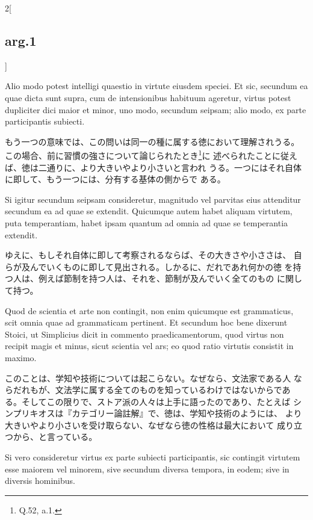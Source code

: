 \documentclass[paper=a4paper,fontsize=10pt,jafontsize=9pt,titlepage]{jlreq}
\begin{document}
\begin{paracol}{2}[\subsection{arg.1}]
\switchcolumn*

Alio modo potest intelligi quaestio in virtute eiusdem speciei. Et
 sic, secundum ea quae dicta sunt supra, cum de intensionibus habituum
 ageretur, virtus potest dupliciter dici maior et minor, uno modo,
 secundum seipsam; alio modo, ex parte participantis subiecti.

\switchcolumn

もう一つの意味では、この問いは同一の種に属する徳において理解されうる。
 この場合、前に習慣の強さについて論じられたとき\footnote{Q.52, a.1.}に
 述べられたことに従えば、徳は二通りに、より大きいやより小さいと言われ
 うる。一つにはそれ自体に即して、もう一つには、分有する基体の側からで
 ある。

\switchcolumn*

Si igitur secundum seipsam consideretur, magnitudo vel parvitas eius
 attenditur secundum ea ad quae se extendit. Quicumque autem habet
 aliquam virtutem, puta temperantiam, habet ipsam quantum ad omnia ad
 quae se temperantia extendit.

\switchcolumn

ゆえに、もしそれ自体に即して考察されるならば、その大きさや小ささは、
 自らが及んでいくものに即して見出される。しかるに、だれであれ何かの徳
 を持つ人は、例えば節制を持つ人は、それを、節制が及んでいく全てのもの
 に関して持つ。

\switchcolumn*

Quod de scientia et arte non contingit, non enim quicumque
 est grammaticus, scit omnia quae ad grammaticam pertinent. Et
 secundum hoc bene dixerunt Stoici, ut Simplicius dicit in commento
 praedicamentorum, quod virtus non recipit magis et minus, sicut
 scientia vel ars; eo quod ratio virtutis consistit in maximo.

\switchcolumn

このことは、学知や技術については起こらない。なぜなら、文法家である人
 ならだれもが、文法学に属する全てのものを知っているわけではないからであ
 る。そしてこの限りで、ストア派の人々は上手に語ったのであり、たとえば
 シンプリキオスは『カテゴリー論註解』で、徳は、学知や技術のようには、
 より大きいやより小さいを受け取らない、なぜなら徳の性格は最大において
 成り立つから、と言っている。

\switchcolumn*

Si vero
 consideretur virtus ex parte subiecti participantis, sic contingit
 virtutem esse maiorem vel minorem, sive secundum diversa tempora, in
 eodem; sive in diversis hominibus.

\switchcolumn


\end{paracol}
\end{document}
